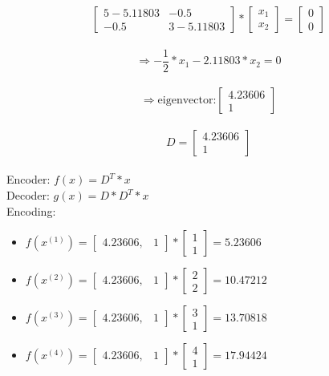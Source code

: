 \documentclass[12pt]{article}
\begin{document}
\begin{enumerate}[a)]
        		$$ \begin{bmatrix} 5-5.11803 & -0.5 \\ -0.5 & 3-5.11803 \end{bmatrix}* \begin{bmatrix} x_1 \\ x_2 \end{bmatrix}
        		=\begin{bmatrix} 0 \\ 0 \end{bmatrix} $$\\
        		$$ \Rightarrow -\frac{1}{2}*x_1 - 2.11803*x_2= 0 $$\\ 
        		$$ \Rightarrow  \text{eigenvector:}  \begin{bmatrix} 4.23606 \\ 1 \end{bmatrix} $$\\
        		$$ D= \begin{bmatrix} 4.23606 \\ 1 \end{bmatrix} $$\\
        		Encoder: $f(x)= D^T * x$\\
        		Decoder: $g(x)= D* D^T *x$\\
        		Encoding:\\
        		\begin{itemize}
        			\item $f(x^{(1)})= \begin{bmatrix} 4.23606, & 1 \end{bmatrix} * \begin{bmatrix} 1 \\ 1 \end{bmatrix} = 5.23606$
        			\item $f(x^{(2)})= \begin{bmatrix} 4.23606, & 1 \end{bmatrix} * \begin{bmatrix} 2 \\ 2 \end{bmatrix} = 10.47212$
        			\item $f(x^{(3)})= \begin{bmatrix} 4.23606, & 1 \end{bmatrix} * \begin{bmatrix} 3 \\ 1 \end{bmatrix} = 13.70818$
        			\item $f(x^{(4)})= \begin{bmatrix} 4.23606, & 1 \end{bmatrix} * \begin{bmatrix} 4 \\ 1 \end{bmatrix} = 17.94424$

\end{itemize}
\end{enumerate}
\end{document}
